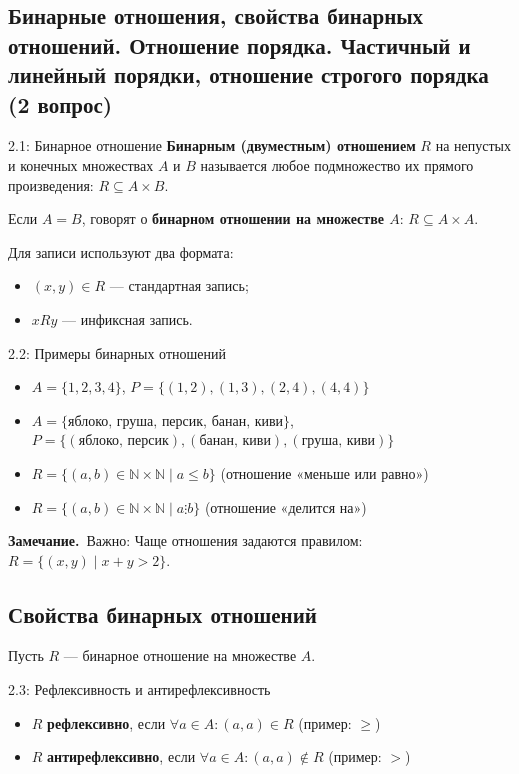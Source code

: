 \documentclass[a4paper,12pt]{article}
\newcommand{\myremark}{\textbf{Замечание.}\ }
\begin{document}
	\subsection{Бинарные отношения, свойства бинарных отношений. Отношение порядка. Частичный и линейный порядки, отношение строгого порядка (2 вопрос)}
	
	\begin{definitionbox}{2.1: Бинарное отношение}
		\textbf{Бинарным (двуместным) отношением} $R$ на непустых и конечных множествах $A$ и $B$ называется любое подмножество их прямого произведения: $R \subseteq A \times B$.
		
		Если $A = B$, говорят о \textbf{бинарном отношении на множестве $A$}: $R \subseteq A \times A$.
	\end{definitionbox}
	
	\noindent Для записи используют два формата:
	\begin{itemize}
		\item $(x, y) \in R$ — стандартная запись;
		\item $xRy$ — инфиксная запись.
	\end{itemize}
	
	\begin{examplebox}{2.2: Примеры бинарных отношений}
		\begin{itemize}
			\item $A = \{1,2,3,4\}$, $P = \{(1,2), (1,3), (2,4), (4,4)\}$
			\item $A = \{\text{яблоко, груша, персик, банан, киви}\}$, \\
			$P = \{(\text{яблоко, персик}), (\text{банан, киви}), (\text{груша, киви})\}$
			\item $R = \{(a,b) \in \mathbb{N} \times \mathbb{N} \mid a \le b\}$ (отношение «меньше или равно»)
			\item $R = \{(a,b) \in \mathbb{N} \times \mathbb{N} \mid a \vdots b\}$ (отношение «делится на»)
		\end{itemize}
	\end{examplebox}
	
	\myremark{Важно:} Чаще отношения задаются правилом: $R = \{(x,y) \mid x + y > 2\}$.
	
	\subsection{Свойства бинарных отношений}
	
	Пусть $R$ — бинарное отношение на множестве $A$.
	
	\begin{definitionbox}{2.3: Рефлексивность и антирефлексивность}
		\begin{itemize}
			\item $R$ \textbf{рефлексивно}, если $\forall a \in A: (a,a) \in R$ (пример: $\ge$)
			\item $R$ \textbf{антирефлексивно}, если $\forall a \in A: (a,a) \notin R$ (пример: $>$)
		\end{itemize}
	\end{definitionbox}
	
\end{document}
